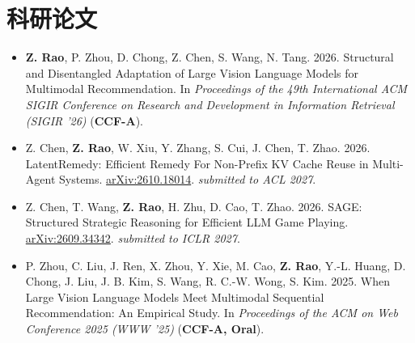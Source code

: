 \documentclass{resume}
\begin{document}
\section{科研论文}
\begin{itemize}

  \item \textbf{Z. Rao}, P. Zhou, D. Chong, Z. Chen, S. Wang, N. Tang. 2026. Structural and Disentangled Adaptation of Large Vision Language Models for Multimodal Recommendation. 
   In \textit{Proceedings of the 49th International ACM SIGIR Conference on Research and Development in Information Retrieval (SIGIR '26)} 
   (\textbf{CCF-A}).

  \item Z. Chen, \textbf{Z. Rao}, W. Xiu, Y. Zhang, S. Cui, J. Chen, T. Zhao. 2026. LatentRemedy: Efficient Remedy For Non-Prefix KV Cache Reuse in Multi-Agent Systems. \href{https://arxiv.org/abs/2610.18014}{arXiv:2610.18014}. \textit{submitted to ACL 2027}.

  \item Z. Chen, T. Wang, \textbf{Z. Rao}, H. Zhu, D. Cao, T. Zhao. 2026. SAGE: Structured Strategic Reasoning for Efficient LLM Game Playing. \href{https://arxiv.org/abs/2609.34342}{arXiv:2609.34342}. \textit{submitted to ICLR 2027}.


  
\item P. Zhou, C. Liu, J. Ren, X. Zhou, Y. Xie, M. Cao, \textbf{Z. Rao}, Y.-L. Huang, D. Chong, J. Liu, J. B. Kim, S. Wang, R. C.-W. Wong, S. Kim. 2025. When Large Vision Language Models Meet Multimodal Sequential Recommendation: An Empirical Study. In \textit{Proceedings of the ACM on Web Conference 2025 (WWW '25)} (\textbf{CCF-A, Oral}).

  

\end{itemize}
\end{document}

